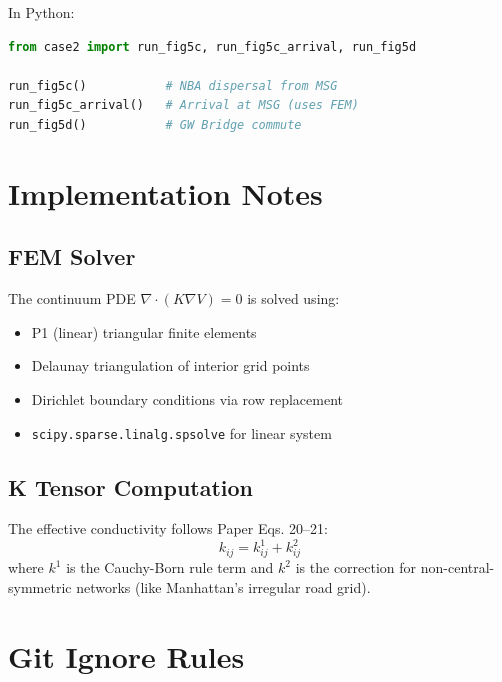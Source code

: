 \documentclass[11pt]{article}
\begin{document}
In Python:
\begin{lstlisting}[language=Python]
from case2 import run_fig5c, run_fig5c_arrival, run_fig5d

run_fig5c()           # NBA dispersal from MSG
run_fig5c_arrival()   # Arrival at MSG (uses FEM)
run_fig5d()           # GW Bridge commute
\end{lstlisting}

\section{Implementation Notes}

\subsection{FEM Solver}

The continuum PDE $\nabla \cdot (K \nabla V) = 0$ is solved using:
\begin{itemize}[noitemsep]
    \item P1 (linear) triangular finite elements
    \item Delaunay triangulation of interior grid points
    \item Dirichlet boundary conditions via row replacement
    \item \texttt{scipy.sparse.linalg.spsolve} for linear system
\end{itemize}

\subsection{K Tensor Computation}

The effective conductivity follows Paper Eqs. 20--21:
\begin{equation}
    k_{ij} = k^1_{ij} + k^2_{ij}
\end{equation}
where $k^1$ is the Cauchy-Born rule term and $k^2$ is the correction for non-central-symmetric networks (like Manhattan's irregular road grid).

\section{Git Ignore Rules}
\end{document}

